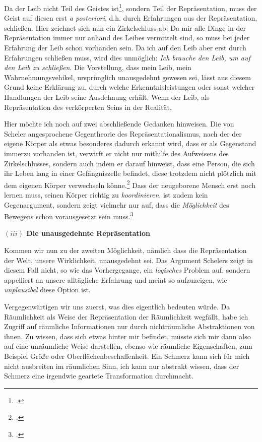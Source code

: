 \documentclass[a4paper, 12pt]{article}
\begin{document}
\begin{onehalfspace}
Da der Leib nicht Teil des Geistes ist\footnote{\Cite[Vgl.][S. 499]{scheler-ethik}.}, sondern Teil der Repräsentation, muss der Geist auf diesen erst \emph{a posteriori}, d.h. durch Erfahrungen aus der Repräsentation, schließen. Hier zeichnet sich nun ein Zirkelschluss ab: Da mir alle Dinge in der Repräsentation immer nur anhand des Leibes vermittelt sind, so muss bei jeder Erfahrung der Leib schon vorhanden sein. Da ich auf den Leib aber erst durch Erfahrungen schließen muss, wird dies unmöglich: \emph{Ich brauche den Leib, um auf den Leib zu schließen}. Die Vorstellung, dass mein Leib, mein Wahrnehmungsvehikel, ursprünglich unausgedehnt gewesen sei, lässt aus diesem Grund keine Erklärung zu, durch welche Erkenntnisleistungen oder sonst welcher Handlungen der Leib seine Ausdehnung erhält. Wenn der Leib, als Repräsentation des verkörperten Seins in der Realität, 

Hier möchte ich noch auf zwei abschließende Gedanken hinweisen. Die von Scheler angesprochene Gegentheorie des Repräsentationalismus, nach der der eigene Körper als etwas besonderes dadurch erkannt wird, dass er als Gegenstand immerzu vorhanden ist, verwirft er nicht nur mithilfe des Aufweisens des Zirkelschlusses, sondern auch indem er darauf hinweist, dass eine Person, die sich ihr Leben lang in einer Gefängniszelle befindet, diese trotzdem nicht plötzlich mit dem eigenen Körper verwechseln könne.\footnote{\Cite[Vgl.][S. 494]{scheler-ethik}.} Dass der neugeborene Mensch erst noch lernen muss, seinen Körper richtig zu \emph{koordinieren}, ist zudem kein Gegenargument, sondern zeigt vielmehr nur auf, dass die \emph{Möglichkeit} des Bewegens schon vorausgesetzt sein muss.\footnote{\Cite[Vgl.][S. 492]{scheler-ethik}.} 


\vspace{5mm}
\noindent\textbf{$(iii)$ Die unausgedehnte Repräsentation}


\noindent Kommen wir nun zu der zweiten Möglichkeit, nämlich dass die Repräsentation der Welt, unsere Wirklichkeit, unausgedehnt sei. Das Argument Schelers zeigt in diesem Fall nicht, so wie das Vorhergegange, ein \emph{logisches} Problem auf, sondern appelliert an unsere alltägliche Erfahrung und 	meint so aufzuzeigen, wie \emph{unplausibel} diese Option ist.


Vergegenwärtigen wir uns zuerst, was dies eigentlich bedeuten würde. Da Räumlichkeit als Weise der Repräsentation der Räumlichkeit wegfällt, habe ich Zugriff auf räumliche Informationen nur durch nichträumliche Abstraktionen von ihnen. Zu wissen, dass sich etwas hinter mir befindet, müsste sich mir dann also auf eine unräumliche Weise darstellen, ebenso wie räumliche Eigenschaften, zum Beispiel Größe oder Oberflächenbeschaffenheit. Ein Schmerz kann sich für mich nicht ausbreiten im räumlichen Sinn, ich kann nur abstrakt wissen, dass der Schmerz eine irgendwie geartete Transformation durchmacht. 


\end{onehalfspace}
\end{document}
